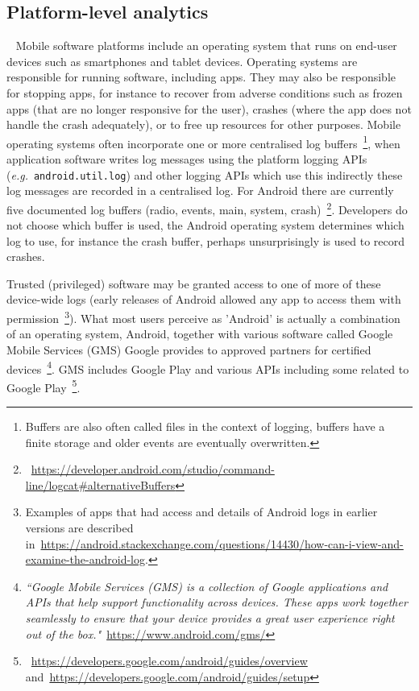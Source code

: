 \subsection{Platform-level analytics}~\label{platform-level-analytics}
Mobile software platforms include an operating system that runs on end-user devices such as smartphones and tablet devices. Operating systems are responsible for running software, including apps. They may also be responsible for stopping apps, for instance to recover from adverse conditions such as frozen apps (that are no longer responsive for the user), crashes (where the app does not handle the crash adequately), or to free up resources for other purposes. Mobile operating systems often incorporate one or more centralised log buffers~\footnote{Buffers are also often called files in the context of logging, buffers have a finite storage and older events are eventually overwritten.}, when application software writes log messages %
using the platform logging APIs (\emph{e.g.}~\texttt{android.util.log}) and other logging APIs which use this indirectly these log messages are recorded in a centralised log. For Android there are currently five documented log buffers (radio, events, main, system, crash)~\footnote{~\url{https://developer.android.com/studio/command-line/logcat\#alternativeBuffers}}. Developers do not choose which buffer is used, the Android operating system determines which log to use, for instance the crash buffer, perhaps unsurprisingly is used to record crashes.

Trusted (privileged) software may be granted access to one of more of these device-wide logs (early releases of Android allowed any app to access them with permission~\footnote{Examples of apps that had access and details of Android logs in earlier versions are described in~\url{https://android.stackexchange.com/questions/14430/how-can-i-view-and-examine-the-android-log}.}). What most users perceive as 'Android' is actually a combination of an operating system, Android, together with various software called Google Mobile Services (GMS) Google provides to approved partners for certified devices~\footnote{\emph{``Google Mobile Services (GMS) is a collection of Google applications and APIs that help support functionality across devices. These apps work together seamlessly to ensure that your device provides a great user experience right out of the box."}~\url{https://www.android.com/gms/}}. GMS includes Google Play and various APIs including some related to Google Play~\footnote{~\url{https://developers.google.com/android/guides/overview} and~\url{https://developers.google.com/android/guides/setup}}.

